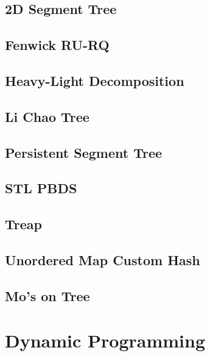 \subsection{2D Segment Tree}

\subsection{Fenwick RU-RQ}

\subsection{Heavy-Light Decomposition}

\subsection{Li Chao Tree}

\subsection{Persistent Segment Tree}

\subsection{STL PBDS}

\subsection{Treap}

\subsection{Unordered Map Custom Hash}

\subsection{Mo's on Tree}

\section{Dynamic Programming}
